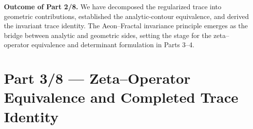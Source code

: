 
\noindent\textbf{Outcome of Part 2/8.}
We have decomposed the regularized trace into geometric contributions,
established the analytic-contour equivalence, and derived the invariant
trace identity. The Aeon–Fractal invariance principle emerges as the
bridge between analytic and geometric sides, setting the stage for the
zeta–operator equivalence and determinant formulation in Parts 3–4.       %



\section*{Part 3/8 — Zeta–Operator Equivalence and Completed Trace Identity}
\relax\hspace{0pt}

